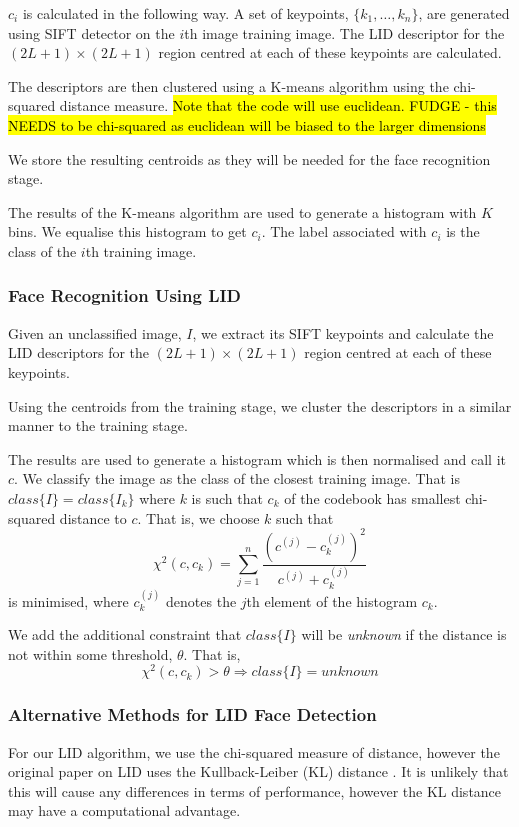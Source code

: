 \documentclass{article}
\begin{document}
$c_i$ is calculated in the following way. A set of keypoints, $\{k_1, \ldots, k_n\}$, are generated using SIFT detector on the $i$th image training image. The LID descriptor for the $(2L+1)\times(2L+1)$ region centred at each of these keypoints are calculated.

The descriptors are then clustered using a K-means algorithm using the chi-squared distance measure. \hl{Note that the code will use euclidean. FUDGE - this NEEDS to be chi-squared as euclidean will be biased to the larger dimensions}

We store the resulting centroids as they will be needed for the face recognition stage.

The results of the K-means algorithm are used to generate a histogram with $K$ bins. We equalise this histogram to get $c_i$. The label associated with $c_i$ is the class of the $i$th training image.

\subsubsection{Face Recognition Using LID}
Given an unclassified image, $I$, we extract its SIFT keypoints and calculate the LID descriptors for the $(2L+1)\times(2L+1)$ region centred at each of these keypoints.

Using the centroids from the training stage, we cluster the descriptors in a similar manner to the training stage.

The results are used to generate a histogram which is then normalised and call it $c$. We classify the image as the class of the closest training image. That is $class\{I\}=class\{I_k\}$ where $k$ is such that $c_k$ of the codebook has smallest chi-squared distance to $c$. That is, we choose $k$ such that
\begin{equation}
	\chi^2(c, c_k) = \sum_{j=1}^{n}\frac{(c^{(j)} - c^{(j)}_k)^2}{c^{(j)} + c^{(j)}_k}
\end{equation}
is minimised, where $c^{(j)}_k$ denotes the $j$th element of the histogram $c_k$.

We add the additional constraint that $class\{I\}$ will be \textit{unknown} if the distance is not within some threshold, $\theta$. That is,
\begin{equation}
	\chi^2(c, c_k) > \theta \Rightarrow class\{I\} = unknown
\end{equation}

\subsubsection{Alternative Methods for LID Face Detection}
\label{sec:alternativeLID}
For our LID algorithm, we use the chi-squared measure of distance, however the original paper on LID uses the Kullback-Leiber (KL) distance \cite{nguyen2011local}. It is unlikely that this will cause any differences in terms of performance, however the KL distance may have a computational advantage.
\end{document}
